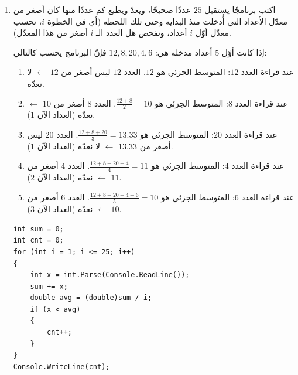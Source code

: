 \documentclass[14pt]{extarticle}
\begin{document}
\begin{enumerate}[resume, itemsep=2em]
\item اكتب برنامجًا يستقبل $25$ عددًا صحيحًا، ويعدّ ويطبع كم عددًا منها كان أصغر من معدّل الأعداد التي أُدخلت منذ البداية وحتى تلك اللحظة (أي في الخطوة $i$، نحسب معدّل أوّل $i$ أعداد، ونفحص هل العدد الـ $i$ أصغر من هذا المعدّل).
\ifdetailed
\begin{boxExample}
إذا كانت أوّل $5$ أعداد مدخلة هي: $12, 8, 20, 4, 6$ فإنّ البرنامج يحسب كالتالي:
\begin{enumerate}[label=(\arabic*), nosep]
    \item عند قراءة العدد $12$: المتوسط الجزئي هو $12$. العدد $12$ ليس أصغر من $12$ $\leftarrow$ لا نعدّه.
    \item عند قراءة العدد $8$: المتوسط الجزئي هو $\frac{12 + 8}{2} = 10$. العدد $8$ أصغر من $10$ $\leftarrow$ نعدّه (العداد الآن $1$).
    \item عند قراءة العدد $20$: المتوسط الجزئي هو $\frac{12 + 8 + 20}{3} = 13.33$. العدد $20$ ليس أصغر من $13.33$ $\leftarrow$ لا نعدّه (العداد الآن $1$).
    \item عند قراءة العدد $4$: المتوسط الجزئي هو $\frac{12 + 8 + 20 + 4}{4} = 11$. العدد $4$ أصغر من $11$ $\leftarrow$ نعدّه (العداد الآن $2$).
    \item عند قراءة العدد $6$: المتوسط الجزئي هو $\frac{12 + 8 + 20 + 4 + 6}{5} = 10$. العدد $6$ أصغر من $10$ $\leftarrow$ نعدّه (العداد الآن $3$).
\end{enumerate}
\end{boxExample}
\fi
\ifwithsols
\begin{boxSolution}
\begin{english}
\begin{verbatim}
int sum = 0;
int cnt = 0;
for (int i = 1; i <= 25; i++)
{
    int x = int.Parse(Console.ReadLine());
    sum += x;
    double avg = (double)sum / i;
    if (x < avg)
    {
        cnt++;
    }
}
Console.WriteLine(cnt);
\end{verbatim}
\end{english}
\end{boxSolution}
\fi
\filbreak


\end{enumerate}
\end{document}
